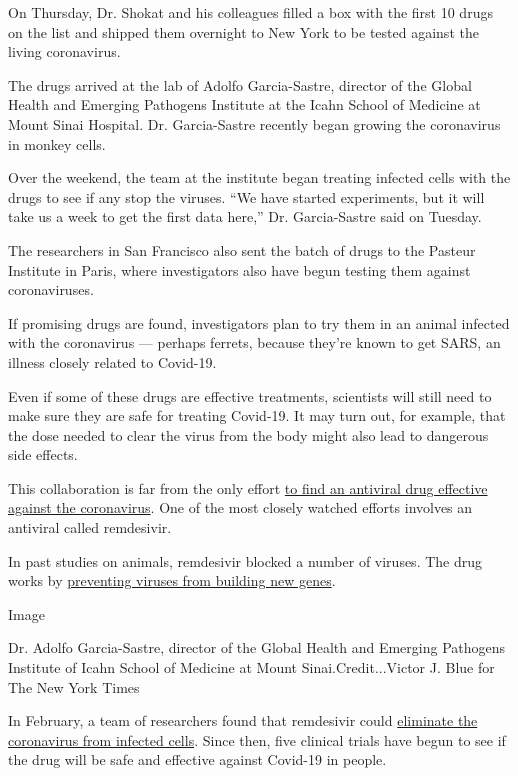 On Thursday, Dr. Shokat and his colleagues filled a box with the first
10 drugs on the list and shipped them overnight to New York to be tested
against the living coronavirus.

The drugs arrived at the lab of Adolfo Garcia-Sastre, director of the
Global Health and Emerging Pathogens Institute at the Icahn School of
Medicine at Mount Sinai Hospital. Dr. Garcia-Sastre recently began
growing the coronavirus in monkey cells.

Over the weekend, the team at the institute began treating infected
cells with the drugs to see if any stop the viruses. ``We have started
experiments, but it will take us a week to get the first data here,''
Dr. Garcia-Sastre said on Tuesday.

The researchers in San Francisco also sent the batch of drugs to the
Pasteur Institute in Paris, where investigators also have begun testing
them against coronaviruses.

If promising drugs are found, investigators plan to try them in an
animal infected with the coronavirus --- perhaps ferrets, because
they're known to get SARS, an illness closely related to Covid-19.

Even if some of these drugs are effective treatments, scientists will
still need to make sure they are safe for treating Covid-19. It may turn
out, for example, that the dose needed to clear the virus from the body
might also lead to dangerous side effects.

This collaboration is far from the only effort
\href{https://pubs.acs.org/doi/10.1021/acscentsci.0c00272}{to find an
antiviral drug effective against the coronavirus}. One of the most
closely watched efforts involves an antiviral called remdesivir.

In past studies on animals, remdesivir blocked a number of viruses. The
drug works by
\href{https://www.jbc.org/content/early/2020/02/24/jbc.AC120.013056}{preventing
viruses from building new genes}.

Image

Dr. Adolfo Garcia-Sastre, director of the Global Health and Emerging
Pathogens Institute of Icahn School of Medicine at Mount
Sinai.Credit...Victor J. Blue for The New York Times

In February, a team of researchers found that remdesivir could
\href{https://www.nature.com/articles/s41422-020-0282-0}{eliminate the
coronavirus from infected cells}. Since then, five clinical trials have
begun to see if the drug will be safe and effective against Covid-19 in
people.

